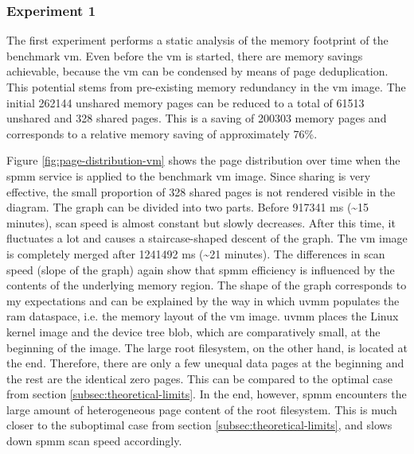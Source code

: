 \subsubsection*{Experiment 1}
\label{subsubsec:ex1}

The first experiment performs a static analysis of the memory footprint of the benchmark \ac{vm}.
Even before the \ac{vm} is started, there are memory savings achievable, because the \ac{vm} can be condensed by means of page deduplication.
This potential stems from pre-existing memory redundancy in the \ac{vm} image.
The initial 262144 unshared memory pages can be reduced to a total of 61513 unshared and 328 shared pages.
This is a saving of 200303 memory pages and corresponds to a relative memory saving of approximately 76\%.

Figure \ref{fig:page-distribution-vm} shows the page distribution over time when the \ac{spmm} service is applied to the benchmark \ac{vm} image.
Since sharing is very effective, the small proportion of 328 shared pages is not rendered visible in the diagram.
The graph can be divided into two parts.
Before 917341 ms (\textasciitilde{}15 minutes), scan speed is almost constant but slowly decreases.
After this time, it fluctuates a lot and causes a staircase-shaped descent of the graph.
The \ac{vm} image is completely merged after 1241492 ms (\textasciitilde{}21 minutes).
The differences in scan speed (slope of the graph) again show that \ac{spmm} efficiency is influenced by the contents of the underlying memory region.
The shape of the graph corresponds to my expectations and can be explained by the way in which \ac{uvmm} populates the \ac{ram} dataspace, i.e. the memory layout of the \ac{vm} image.
\Ac{uvmm} places the Linux kernel image and the device tree blob, which are comparatively small, at the beginning of the image.
The large root filesystem, on the other hand, is located at the end.
Therefore, there are only a few unequal data pages at the beginning and the rest are the identical zero pages.
This can be compared to the optimal case from section \ref{subsec:theoretical-limits}.
In the end, however, \ac{spmm} encounters the large amount of heterogeneous page content of the root filesystem.
This is much closer to the suboptimal case from section \ref{subsec:theoretical-limits}, and slows down \ac{spmm} scan speed accordingly.

